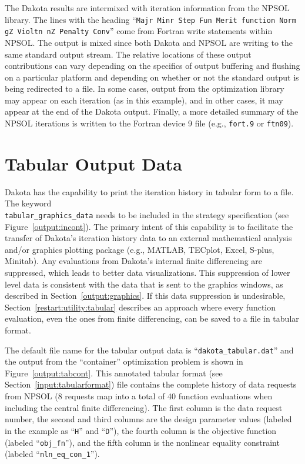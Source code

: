 The Dakota results are intermixed with iteration information from the
NPSOL library. The lines with the heading ``\texttt{Majr Minr Step Fun
  Merit function Norm gZ Violtn nZ Penalty Conv}'' come from Fortran
write statements within NPSOL. The output is mixed since both Dakota
and NPSOL are writing to the same standard output stream. The relative
locations of these output contributions can vary depending on the
specifics of output buffering and flushing on a particular platform
and depending on whether or not the standard output is being
redirected to a file. In some cases, output from the optimization
library may appear on each iteration (as in this example), and in
other cases, it may appear at the end of the Dakota output. Finally, a
more detailed summary of the NPSOL iterations is written to the
Fortran device 9 file (e.g., \texttt{fort.9} or \texttt{ftn09}).

\section{Tabular Output Data}\label{output:tabular}

Dakota has the capability to print the iteration history in tabular
form to a file. The keyword\\
\texttt{tabular\_graphics\_data} needs to be included in the strategy 
specification (see Figure~\ref{output:incont}). The primary intent
of this capability is to facilitate the transfer of Dakota's iteration
history data to an external mathematical analysis and/or graphics
plotting package (e.g., MATLAB, TECplot, Excel, S-plus, Minitab). Any
evaluations from Dakota's internal finite differencing are suppressed,
which leads to better data visualizations. This suppression of lower
level data is consistent with the data that is sent to the graphics
windows, as described in Section~\ref{output:graphics}. If this data
suppression is undesirable, Section~\ref{restart:utility:tabular}
describes an approach where every function evaluation, even the ones
from finite differencing, can be saved to a file in tabular format.

The default file name for the tabular output data is
``\texttt{dakota\_tabular.dat}'' and the output from the ``container''
optimization problem is shown in Figure~\ref{output:tabcont}. This
annotated tabular format (see Section~\ref{input:tabularformat}) file
contains the complete history of data requests from NPSOL (8 requests
map into a total of 40 function evaluations when including the central
finite differencing). The first column is the data request number, the
second and third columns are the design parameter values (labeled in
the example as ``\texttt{H}'' and ``\texttt{D}''), the fourth column
is the objective function (labeled ``\texttt{obj\_fn}''), and the
fifth column is the nonlinear equality constraint (labeled
``\texttt{nln\_eq\_con\_1}'').

